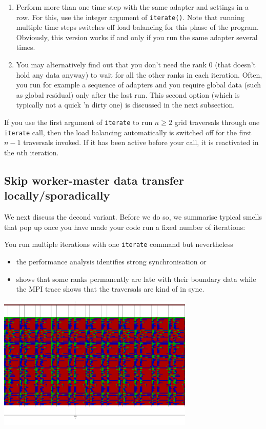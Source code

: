 \begin{enumerate}
  \item Perform more than one time step with the same adapter and settings in a
  row. For this, use the integer argument of \texttt{iterate()}. Note that
  running multiple time steps switches off load balancing for this phase of the program.
  Obviously, this version works if and only if you run the same adapter several 
  times.
  \item You may alternatively find out that you don't need the rank 0 (that
  doesn't hold any data anyway) to wait for all the other ranks in each
  iteration. Often, you run for example a sequence of adapters and you require
  global data (such as global residual) only after the last run. 
  This second option (which is typically not a quick 'n dirty one) is discussed
  in the next subsection. 
\end{enumerate}

\begin{remark}
 If you use the first argument of \texttt{iterate} to run $n\geq 2$ grid
 traversals through one  \texttt{iterate} call, then the load balancing
 automatically is switched off for the first $n-1$ traversals invoked. If
 it has been active before your call, it is reactivated in the $n$th iteration.
\end{remark}


\subsection{Skip worker-master data transfer locally/sporadically}

We next discuss the decond variant.
Before we do so, we summarise typical smells that pop up once you have made 
your code run a fixed number of iterations:

\begin{smell}
You run multiple iterations with one \texttt{iterate} command but nevertheless
 \begin{itemize}
  \item the performance analysis identifies strong synchronisation or
  \item shows that some ranks permanently are late with their boundary data
  while the MPI trace shows that the traversals are kind of in sync.
 \end{itemize}
\end{smell}

\begin{center}
  \includegraphics[width=0.7\textwidth]{63_mpi-synchronisation/no-skip-of-reduction.png}
\end{center}

